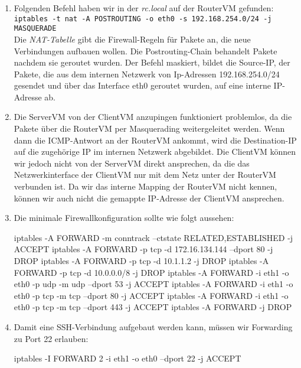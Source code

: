 \documentclass[a4paper,10pt]{scrartcl}
\begin{document}
\begin{enumerate}[\bfseries 1.]
	\item
        Folgenden Befehl haben wir in der \textit{rc.local} auf der RouterVM gefunden:\\
        \texttt{iptables -t nat -A POSTROUTING -o eth0 -s 192.168.254.0/24 -j MASQUERADE}\\
        Die \textit{NAT-Tabelle} gibt die Firewall-Regeln für Pakete an, die neue
        Verbindungen aufbauen wollen. Die Postrouting-Chain behandelt Pakete nachdem
        sie geroutet wurden. Der Befehl maskiert, bildet die Source-IP, der Pakete,
        die aus dem internen Netzwerk von Ip-Adressen 192.168.254.0/24 gesendet und
        über das Interface eth0 geroutet wurden, auf eine interne IP-Adresse ab.

	\item
        Die ServerVM von der ClientVM anzupingen funktioniert problemlos,
        da die Pakete über die RouterVM per Masquerading weitergeleitet werden.
        Wenn dann die ICMP-Antwort an der RouterVM ankommt, wird die Destination-IP
        auf die zugehörige IP im internen Netzwerk abgebildet.
        Die ClientVM können wir jedoch nicht von der ServerVM direkt ansprechen, da
        die das Netzwerkinterface der ClientVM nur mit dem Netz unter der RouterVM
        verbunden ist. Da wir das interne Mapping der RouterVM nicht kennen, können
        wir auch nicht die gemappte IP-Adresse der ClientVM ansprechen.

	\item
        Die minimale Firewallkonfiguration sollte wie folgt aussehen:
        \begin{rootcommands}
iptables -A FORWARD -m conntrack --ctstate RELATED,ESTABLISHED -j ACCEPT
iptables -A FORWARD -p tcp -d 172.16.134.144 --dport 80 -j DROP
iptables -A FORWARD -p tcp -d 10.1.1.2 -j DROP
iptables -A FORWARD -p tcp -d 10.0.0.0/8 -j DROP
iptables -A FORWARD -i eth1 -o eth0 -p udp -m udp --dport 53 -j ACCEPT
iptables -A FORWARD -i eth1 -o eth0 -p tcp -m tcp --dport 80 -j ACCEPT
iptables -A FORWARD -i eth1 -o eth0 -p tcp -m tcp --dport 443 -j ACCEPT
iptables -A FORWARD -j DROP
        \end{rootcommands}

	\item
        Damit eine SSH-Verbindung aufgebaut werden kann, müssen wir Forwarding zu Port
        22 erlauben:
        \begin{rootcommands}
iptables -I FORWARD 2 -i eth1 -o eth0 --dport 22 -j ACCEPT
        \end{rootcommands}


\end{enumerate}
\end{document}
